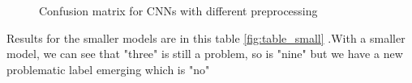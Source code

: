 \begin{figure}[h!]

    \centering
    \qquad
    \caption{Confusion matrix for CNNs with different preprocessing}
    \label{fig:confusion_cnn}

\end{figure}


\newpage



Results for the smaller models are in this table \ref{fig:table_small} .With a smaller model, we can see that "three" is still a problem, so is "nine" but we have a new problematic label emerging which is "no"

